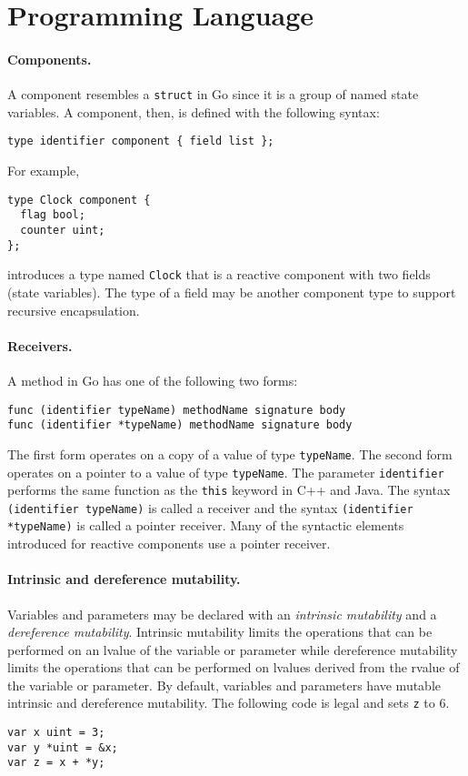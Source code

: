 \section{Programming Language}

\paragraph{Components.}
A component resembles a \verb+struct+ in Go since it is a group of named state variables.
A component, then, is defined with the following syntax:
\begin{verbatim}
type identifier component { field list };
\end{verbatim}
For example,
\begin{verbatim}
type Clock component {
  flag bool;
  counter uint;
};
\end{verbatim}
introduces a type named \verb+Clock+ that is a reactive component with two fields (state variables).
The type of a field may be another component type to support recursive encapsulation.

\paragraph{Receivers.}
A method in Go has one of the following two forms:
\begin{verbatim}
func (identifier typeName) methodName signature body
func (identifier *typeName) methodName signature body
\end{verbatim}
The first form operates on a copy of a value of type \verb+typeName+.
The second form operates on a pointer to a value of type \verb+typeName+.
The parameter \verb+identifier+ performs the same function as the \verb+this+ keyword in C++ and Java.
The syntax \verb+(identifier typeName)+ is called a receiver and the syntax \verb+(identifier *typeName)+ is called a pointer receiver.
Many of the syntactic elements introduced for reactive components use a pointer receiver.

\paragraph{Intrinsic and dereference mutability.}
Variables and parameters may be declared with an \emph{intrinsic mutability} and a \emph{dereference mutability}.
Intrinsic mutability limits the operations that can be performed on an lvalue of the variable or parameter while dereference mutability limits the operations that can be performed on lvalues derived from the rvalue of the variable or parameter.
By default, variables and parameters have mutable intrinsic and dereference mutability.
The following code is legal and sets \verb+z+ to 6.
\begin{verbatim}
var x uint = 3;
var y *uint = &x;
var z = x + *y;
\end{verbatim}

